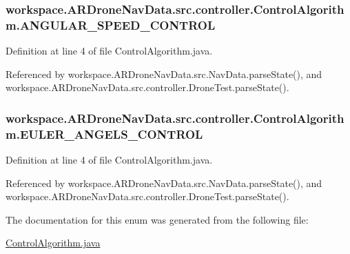 \subsubsection[{A\+N\+G\+U\+L\+A\+R\+\_\+\+S\+P\+E\+E\+D\+\_\+\+C\+O\+N\+T\+R\+O\+L}]{\setlength{\rightskip}{0pt plus 5cm}workspace.\+A\+R\+Drone\+Nav\+Data.\+src.\+controller.\+Control\+Algorithm.\+A\+N\+G\+U\+L\+A\+R\+\_\+\+S\+P\+E\+E\+D\+\_\+\+C\+O\+N\+T\+R\+O\+L}\label{enumworkspace_1_1_a_r_drone_nav_data_1_1src_1_1controller_1_1_control_algorithm_a066bc7f8231c90e53b86e3713d05cd5d}


Definition at line 4 of file Control\+Algorithm.\+java.



Referenced by workspace.\+A\+R\+Drone\+Nav\+Data.\+src.\+Nav\+Data.\+parse\+State(), and workspace.\+A\+R\+Drone\+Nav\+Data.\+src.\+controller.\+Drone\+Test.\+parse\+State().

\hypertarget{enumworkspace_1_1_a_r_drone_nav_data_1_1src_1_1controller_1_1_control_algorithm_a03138d5ed0be6d9f44da477149e50f82}{}
\subsubsection[{E\+U\+L\+E\+R\+\_\+\+A\+N\+G\+E\+L\+S\+\_\+\+C\+O\+N\+T\+R\+O\+L}]{\setlength{\rightskip}{0pt plus 5cm}workspace.\+A\+R\+Drone\+Nav\+Data.\+src.\+controller.\+Control\+Algorithm.\+E\+U\+L\+E\+R\+\_\+\+A\+N\+G\+E\+L\+S\+\_\+\+C\+O\+N\+T\+R\+O\+L}\label{enumworkspace_1_1_a_r_drone_nav_data_1_1src_1_1controller_1_1_control_algorithm_a03138d5ed0be6d9f44da477149e50f82}


Definition at line 4 of file Control\+Algorithm.\+java.



Referenced by workspace.\+A\+R\+Drone\+Nav\+Data.\+src.\+Nav\+Data.\+parse\+State(), and workspace.\+A\+R\+Drone\+Nav\+Data.\+src.\+controller.\+Drone\+Test.\+parse\+State().



The documentation for this enum was generated from the following file\+:\begin{DoxyCompactItemize}
\item 
\hyperlink{_control_algorithm_8java}{Control\+Algorithm.\+java}\end{DoxyCompactItemize}
